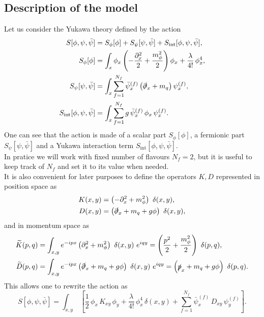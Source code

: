 \subsection{Description of the model}
Let us consider the Yukawa theory defined by the action
\begin{equation}
\begin{aligned}
    S[\phi,\psi,\bar\psi] &= S_\phi[\phi] + S_\psi[\psi, \bar\psi] + S_\text{int}[\phi, \psi, \bar\psi], \\
     S_\phi[\phi] &= \int_x \phi_x \left(-\frac{\partial^2_x}{2} + \frac{m_\phi^2}{2}\right) \phi_x + \frac{\lambda}{4!} \, \phi_x^4, \\
     S_\psi[\psi, \bar\psi] &= \int_x \sum_{f=1}^{N_f} \bar \psi_x^{(f)} \left(\slashed{\partial}_x + m_q \right) \psi_x^{(f)}, \\
     S_\text{int}[\phi, \psi, \bar\psi] &= \int_x \sum_{f=1}^{N_f} g \, \bar \psi_x^{(f)} \, \phi_x \, \psi_x^{(f)}.
    \label{eq:full_action_continuum}
\end{aligned}
\end{equation}
One can see that the action is made of a scalar part $S_\phi[\phi]$, a fermionic part $S_\psi[\psi, \bar\psi]$ and a Yukawa interaction term $S_\text{int}[\phi, \psi, \bar\psi]$. \\
In pratice we will work with fixed number of flavours $N_f = 2$, but it is useful to keep track of $N_f$ and set it to its value when needed. \\
It is also convenient for later purposes to define the operators $K, D$ represented in position space as 
\begin{equation}
    \begin{aligned}
        K(x, y) &=  \left(-\partial^2_x + m_\phi^2\right) \ \delta(x,y), \\
        D(x, y) &= \left(\slashed{\partial}_x + m_q + g\phi \right) \ \delta(x,y),
    \end{aligned}
    \label{eq:definition_kinetic_terms_continuum_position}
\end{equation}
and in momentum space as
\begin{equation}
    \begin{aligned}
        \widetilde{K}(p, q) &=  \int_{x,y} e^{-ipx} \left(\partial^2_x + m_\phi^2\right) \ \delta(x,y) \ e^{iqy} = \left(\frac{p^2}{2} + \frac{m_\phi^2}{2}\right) \ \delta(p,q), \\
        \widetilde{D}(p, q) &= \int_{x,y} e^{-ipx} \left(\slashed{\partial}_x + m_q + g\phi \right) \ \delta(x,y) \ e^{iqy} = \left(\slashed{p}_x + m_q + g\phi \right) \ \delta(p,q).
    \end{aligned}
    \label{eq:definition_kinetic_terms_continuum_momentum}
\end{equation}
This allows one to rewrite the action as
\begin{equation*}
    S[\phi,\psi,\bar\psi] = \int_{x,y} \ \left[\frac{1}{2} \, \phi_x \, K_{xy} \, \phi_y + \frac{\lambda}{4!} \, \phi_x^4 \, \delta(x,y) + \sum_{f=1}^{N_f} \bar\psi_x^{(f)} \, D_{xy} \, \psi_y^{(f)}\right].
\end{equation*}

